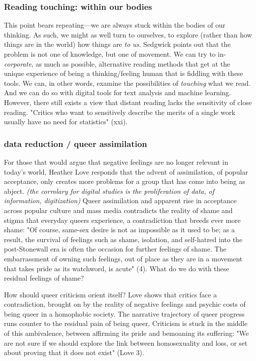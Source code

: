 \documentclass[11pt]{article}
\begin{document}
\subsubsection{Reading touching: within our bodies}
\label{sec:orgf3d40e3}
This point bears repeating---we are always stuck within the bodies of
our thinking. As such, we might as well turn to ourselves, to explore
(rather than how things are in the world) how things are \emph{to
us}. Sedgwick points out that the problem is not one of knowledge, but
one of movement. We can try to in-\emph{corporate}, as much as possible,
alternative reading methods that get at the unique experience of being
a thinking/feeling human that is fiddling with these tools. We can, in
other words, examine the possibilities of \emph{touching} what we read. And
we can do so with digital tools for text analysis and machine
learning.  However, there still exists a view that distant reading
lacks the sensitivity of close reading. "Critics who want to
sensitively describe the merits of a single work usually have no need
for statistics" (xxi).

\subsubsection{data reduction / queer assimilation}
\label{sec:orga8bdec9}
For those that would argue that negative feelings are no longer
relevant in today's world, Heather Love responds that the advent of
assimilation, of popular acceptance, only creates more problems for a
group that has come into being as abject. \emph{(the corrolary for digital
studies is the proliferation of data, of information, digitization)}
Queer assimilation and apparent rise in acceptance across popular
culture and mass media contradicts the reality of shame and stigma
that everyday queers experience, a contradiction that breeds ever more
shame: "Of course, same-sex desire is not as impossible as it used to
be; as a result, the survival of feelings such as shame, isolation,
and self-hatred into the post-Stonewall era is often the occasion for
further feelings of shame. The embarrassment of owning such feelings,
out of place as they are in a movement that takes pride as its
watchword, is acute" (4). What do we do with these residual feelings
of shame?

How should queer criticism orient itself? Love shows that critics face
a contradiction, brought on by the reality of negative feelings and
psychic costs of being queer in a homophobic society. The narrative
trajectory of queer progress runs counter to the residual pain of
being queer. Criticism is stuck in the middle of this ambivalence,
between affirming its pride and bemoaning its suffering: "We are not
sure if we should explore the link between homosexuality and loss, or
set about proving that it does not exist" (Love 3).
\end{document}
